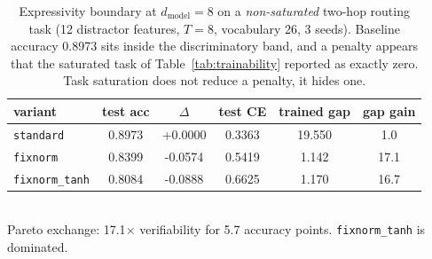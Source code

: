 \documentclass[10pt,journal]{IEEEtran}
\begin{document}
\begin{table}[t]
\centering
\caption{Expressivity boundary at $d_{\text{model}}=8$ on a \emph{non-saturated} two-hop routing task (12 distractor features, $T=8$, vocabulary 26, 3 seeds). Baseline accuracy \num{0.8973} sits inside the discriminatory band, and a penalty appears that the saturated task of Table~\ref{tab:trainability} reported as exactly zero. Task saturation does not reduce a penalty, it hides one.}
\label{tab:expressivity}
\begin{tabular}{l S[table-format=1.4] S[table-format=+1.4] S[table-format=1.4] S[table-format=2.3] S[table-format=2.1]}
\toprule
variant & {test acc} & {$\Delta$} & {test CE} & {trained gap} & {gap gain} \\
\midrule
\texttt{standard} & 0.8973 & +0.0000 & 0.3363 & 19.550 & 1.0 \\
\texttt{fixnorm} & 0.8399 & -0.0574 & 0.5419 & 1.142 & 17.1 \\
\texttt{fixnorm\_tanh} & 0.8084 & -0.0888 & 0.6625 & 1.170 & 16.7 \\
\bottomrule
\end{tabular}
\\[2pt]\footnotesize Pareto exchange: \num{17.1}$\times$ verifiability for \num{5.7} accuracy points. \texttt{fixnorm\_tanh} is dominated.
\end{table}
\end{document}
